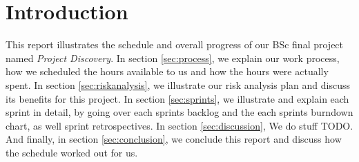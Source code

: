 \section{Introduction}\label{sec:introduction}

This report illustrates the schedule and overall progress of our BSc final project named \emph{Project Discovery}. In section \ref{sec:process}, we explain our work process, how we scheduled the hours available to us and how the hours were actually spent. In section \ref{sec:riskanalysis}, we illustrate our risk analysis plan and discuss its benefits for this project. In section \ref{sec:sprints}, we illustrate and explain each sprint in detail, by going over each sprints backlog and the each sprints burndown chart, as well sprint retrospectives. In section \ref{sec:discussion}, We do stuff TODO. And finally, in section \ref{sec:conclusion}, we conclude this report and discuss how the schedule worked out for us. 